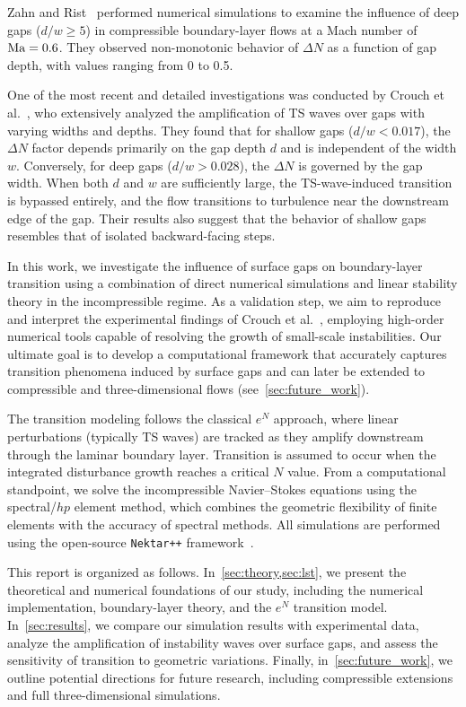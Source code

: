 \documentclass[../main.tex]{subfiles}
\begin{document}
Zahn and Rist~\cite{zahnRist} performed numerical simulations to examine the influence of deep gaps ($d/w \geq 5$) in compressible boundary-layer flows at a Mach number of $\text{Ma} = 0.6$. They observed non-monotonic behavior of $\Delta N$ as a function of gap depth, with values ranging from 0 to 0.5.

One of the most recent and detailed investigations was conducted by Crouch et al.~\cite{jeffGaps}, who extensively analyzed the amplification of TS waves over gaps with varying widths and depths. They found that for shallow gaps ($d/w < 0.017$), the $\Delta N$ factor depends primarily on the gap depth $d$ and is independent of the width $w$. Conversely, for deep gaps ($d/w > 0.028$), the $\Delta N$ is governed by the gap width. When both $d$ and $w$ are sufficiently large, the TS-wave-induced transition is bypassed entirely, and the flow transitions to turbulence near the downstream edge of the gap. Their results also suggest that the behavior of shallow gaps resembles that of isolated backward-facing steps.

In this work, we investigate the influence of surface gaps on boundary-layer transition using a combination of direct numerical simulations and linear stability theory in the incompressible regime. As a validation step, we aim to reproduce and interpret the experimental findings of Crouch et al.~\cite{jeffGaps}, employing high-order numerical tools capable of resolving the growth of small-scale instabilities. Our ultimate goal is to develop a computational framework that accurately captures transition phenomena induced by surface gaps and can later be extended to compressible and three-dimensional flows (see~\cref{sec:future_work}).

The transition modeling follows the classical $e^N$ approach, where linear perturbations (typically TS waves) are tracked as they amplify downstream through the laminar boundary layer. Transition is assumed to occur when the integrated disturbance growth reaches a critical $N$ value. From a computational standpoint, we solve the incompressible Navier--Stokes equations using the spectral/$hp$ element method, which combines the geometric flexibility of finite elements with the accuracy of spectral methods. All simulations are performed using the open-source \texttt{Nektar++} framework~\cite{nektar}.

This report is organized as follows. In~\cref{sec:theory,sec:lst}, we present the theoretical and numerical foundations of our study, including the numerical implementation, boundary-layer theory, and the $e^N$ transition model. In~\cref{sec:results}, we compare our simulation results with experimental data, analyze the amplification of instability waves over surface gaps, and assess the sensitivity of transition to geometric variations. Finally, in~\cref{sec:future_work}, we outline potential directions for future research, including compressible extensions and full three-dimensional simulations.
\end{document}
